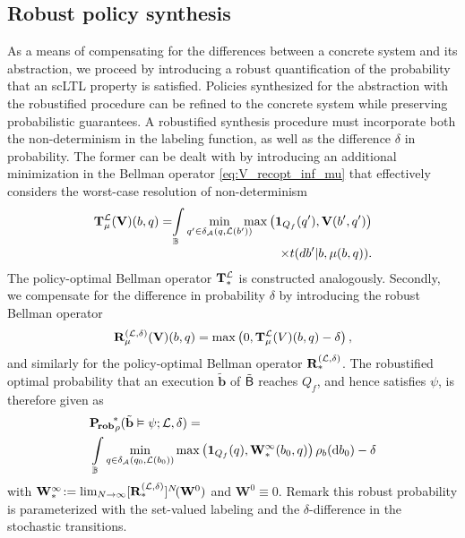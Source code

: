 \documentclass{ifacconf}
\begin{document}
\subsection{Robust policy synthesis}

As a means of compensating for the differences between a concrete system and its abstraction, we proceed by introducing a robust quantification of the probability that an scLTL property is satisfied. Policies synthesized for the abstraction with the robustified procedure can be refined to the concrete system while preserving probabilistic guarantees. A robustified synthesis procedure must incorporate both the non-determinism in the labeling function, as well as the difference $\delta$ in probability. The former can be dealt with by introducing an additional minimization in the Bellman operator \eqref{eq:V_recopt_inf_mu} that effectively considers the worst-case resolution of non-determinism
\begin{align}
  \Bel_\pol^\Labset (\mathbf V)(b,q) = \hspace{-1mm} \int_\Xb
  \min_{q' \in \delta_\FSA(q, \Labset( b'))} \hspace{-3mm} \max \left( \mathbf 1_{Q_f}(q'), \mathbf V( b',q') \right)  \notag\\[-.3em]
   \times {\tr}(d b'|b,\pol(b,q)).\label{eq:V_recopt_nondet}
\end{align}
The policy-optimal Bellman operator ${\mathbf {T}}_\ast^{\mathcal{L}}$ is constructed analogously. Secondly, we compensate for the difference in probability $\delta$ by introducing the robust Bellman operator
\begin{equation}
  \label{eq:V_recopt_nondet_rob}
  {\mathbf {R}}_{\mu}^{(\mathcal{L},\delta)} (\mathbf V)(b,q) = \max \left( 0, {\mathbf {T}}_{\mu}^{\mathcal{L}} (V)(b,q) - \delta  \right),
\end{equation}
and similarly for the policy-optimal Bellman operator ${\mathbf {R}}_\ast^{(\mathcal{L}, \delta)}$. The robustified optimal probability that an execution $\tilde{\mathbf{b}}$ of $\tilde {\mathsf{B}}$ reaches $Q_f$, and hence satisfies $\psi$, is therefore given as
\begin{equation}
\label{eq:prob:robust_optimal}
\begin{aligned}
  &\mathbf{P_{\! rob}}_\init^{\!\ast} (\tilde{\mathbf{b}} \vDash \psi; \Labset,\delta) =\\ & \int_{\Xb}\min_{\bar q \in \delta_\FSA(q_0,\Labset(b_0))}  \max \left( \mathbf 1_{Q_f}(\bar q), \mathbf W^\infty_\ast(b_0,\bar q) \right) \initb(\mathrm{d} b_0) -\delta
\end{aligned}
\end{equation}
with
$\mathbf W^\infty_\ast \!:=  \lim_{N\rightarrow\infty}[{\mathbf {R}}_\ast^{(\mathcal{L},\delta)}]^N\! (\mathbf W^0)$ and $\mathbf W^0\equiv0$. Remark this robust probability is parameterized with the set-valued labeling and the $\delta$-difference in the stochastic transitions.
\end{document}
